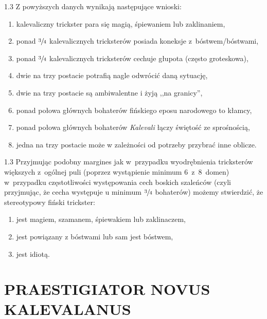 \documentclass[11pt,a4paper,twoside]{report}
\begin{document}
\newpage
\vspace*{3.5\baselineskip}
\begin{spacing}{1.3}
Z powyższych danych wynikają następujące wnioski:
\vspace{\baselineskip}
\begin{enumerate}[1)]   %
  \item kalevaliczny trickster para się magią, śpiewaniem lub zaklinaniem,
  \item ponad $\sfrac{3}{4}$ kalevalicznych tricksterów posiada koneksje z~bóstwem/bóstwami,
  \item ponad $\sfrac{3}{4}$ kalevalicznych tricksterów cechuje głupota (często groteskowa),
  \item dwie na trzy postacie potrafią nagle odwrócić daną sytuację,
  \item dwie na trzy postacie są ambiwalentne i żyją ,,na granicy”,
  \item ponad połowa głównych bohaterów fińskiego eposu narodowego to kłamcy,
  \item ponad połowa głównych bohaterów \emph{Kalevali} łączy świętość ze sprośnością,
  \item jedna na trzy postacie może w zależności od potrzeby przybrać inne oblicze.\\
\end{enumerate}
\end{spacing}
\begin{spacing}{1.3}
Przyjmując podobny margines jak w~przypadku wyodrębnienia tricksterów większych z~ogólnej puli (poprzez wystąpienie minimum 6~z~8~domen) w~przypadku częstotliwości występowania cech boskich szaleńców (czyli przyjmując, że cecha występuje u minimum $\sfrac{3}{4}$ bohaterów) możemy stwierdzić, że stereotypowy fiński trickster:

\begin{enumerate}[1)]
  \item jest magiem, szamanem, śpiewakiem lub zaklinaczem,
  \item jest powiązany z bóstwami lub sam jest bóstwem,
  \item jest idiotą.
\end{enumerate}
\end{spacing}


\clearpage{\pagestyle{empty}\cleardoublepage}
\part{PRAESTIGIATOR NOVUS KALEVALANUS}
\clearpage{\pagestyle{empty}\cleardoublepage}
\end{document}
